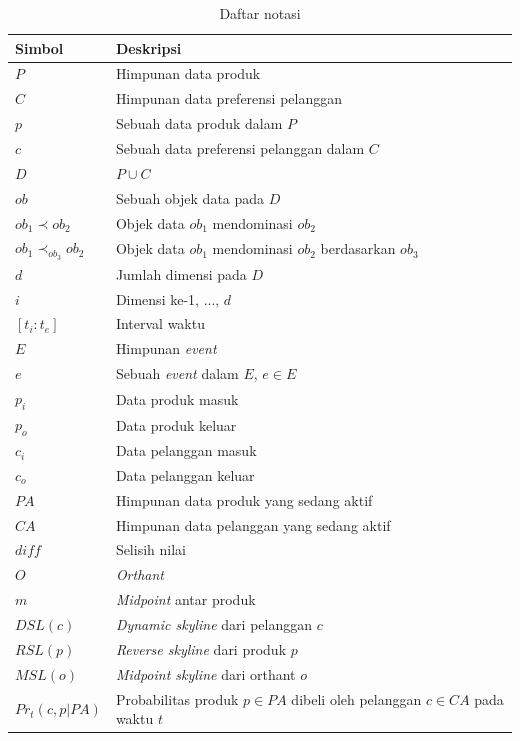 \documentclass[conference]{IEEEtran}
\begin{document}
\begin{table}[htbp]
	\caption{Daftar notasi}
	\begin{center}
		\begin{tabular}{| p{2.5cm} | p{4.5cm} |}
		\hline
		\textbf{Simbol} & \textbf{Deskripsi} \\ \hline
		$P$ & Himpunan data produk\\ \hline
		$C$ & Himpunan data preferensi pelanggan\\ \hline
		$p$ & Sebuah data produk dalam $P$\\ \hline
		$c$ & Sebuah data preferensi pelanggan dalam $C$\\ \hline
		$D$ & $P \cup C$ \\ \hline
		$ob$ & Sebuah objek data pada $D$\\ \hline
		$ob_1 \prec ob_2$ & Objek data $ob_1$ mendominasi $ob_2$\\ \hline
		$ob_1 \prec_{ob_3} ob_2$ & Objek data $ob_1$ mendominasi $ob_2$ berdasarkan $ob_3$\\ \hline
		$d$ & Jumlah dimensi pada $D$\\ \hline
		$i$ & Dimensi ke-1, ..., $d$\\ \hline
		$[t_i:t_e]$ & Interval waktu \\ \hline
		$E$ & Himpunan \textit{event} \\ \hline
		$e$ & Sebuah \textit{event} dalam $E$, $e \in E$ \\ \hline
		$p_{i}$ & Data produk masuk \\ \hline
		$p_{o}$ & Data produk keluar \\ \hline
		$c_{i}$ & Data pelanggan masuk \\ \hline
		$c_{o}$ & Data pelanggan keluar \\ \hline
		$PA$ & Himpunan data produk yang sedang aktif \\ \hline	
		$CA$ & Himpunan data pelanggan yang sedang aktif \\ \hline
		$diff$ & Selisih nilai \\ \hline
		$O$ & \textit{Orthant}\\ \hline
		$m$ & \textit{Midpoint} antar produk\\ \hline
		$DSL(c)$ & \textit{Dynamic skyline} dari pelanggan $c$\\ \hline
		$RSL(p)$ & \textit{Reverse skyline} dari produk $p$\\ \hline
		$MSL(o)$ & \textit{Midpoint skyline} dari orthant $o$\\ \hline
		$Pr_t(c, p|PA)$ & Probabilitas produk $p \in PA$ dibeli oleh pelanggan $c \in CA$ pada waktu $t$ \\ \hline

\end{tabular}
\end{center}
\end{table}
\end{document}
